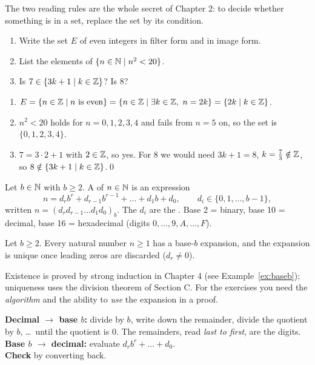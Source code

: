 The two reading rules are the whole secret of Chapter 2: to decide whether something is in a set, replace the set by its condition.

\begin{hexample}
\begin{enumerate}
\item Write the set $E$ of even integers in filter form and in image form.
\item List the elements of $\{n\in\mathbb{N}\mid n^2<20\}$.
\item Is $7\in\{3k+1\mid k\in\mathbb{Z}\}$? Is $8$?
\end{enumerate}
\solution
\begin{enumerate}
\item $E=\{n\in\mathbb{Z}\mid n \text{ is even}\}=\{n\in\mathbb{Z}\mid \exists k\in\mathbb{Z},\ n=2k\}=\{2k\mid k\in\mathbb{Z}\}$.
\item $n^2<20$ holds for $n=0,1,2,3,4$ and fails from $n=5$ on, so the set is $\{0,1,2,3,4\}$.\reason{$0\in\N$!}
\item $7=3\cdot2+1$ with $2\in\mathbb{Z}$, so yes. For $8$ we would need $3k+1=8$, \ie $k=\tfrac73\notin\mathbb{Z}$, so $8\notin\{3k+1\mid k\in\mathbb{Z}\}$.\qed
\end{enumerate}
\end{hexample}


\begin{key}
Let $b\in\mathbb{N}$ with $b\ge2$. A  of $n\in\mathbb{N}$ is an expression
\[
n=d_r b^r+d_{r-1}b^{r-1}+\dots+d_1 b+d_0,\qquad d_i\in\{0,1,\dots,b-1\},
\]
written $n=(d_r d_{r-1}\dots d_1 d_0)_b$. The $d_i$ are the . Base 2 = binary, base 10 = decimal, base 16 = hexadecimal (digits $0,\dots,9,A,\dots,F$).
\end{key}

\begin{result}
Let $b\ge2$. Every natural number $n\ge1$ has a base-$b$ expansion, and the expansion is unique once leading zeros are discarded ($d_r\ne0$).
\end{result}
Existence is proved by strong induction in Chapter 4 (see Example~\ref{ex:baseb}); uniqueness uses the division theorem of Section C. For the exercises you need the \emph{algorithm} and the ability to \emph{use} the expansion in a proof.

\begin{strategy}
\textbf{Decimal $\to$ base $b$:} divide by $b$, write down the remainder, divide the quotient by $b$, \dots\ until the quotient is $0$. The remainders, read \emph{last to first}, are the digits.\\
\textbf{Base $b$ $\to$ decimal:} evaluate $d_r b^r+\dots+d_0$.\\
\textbf{Check} by converting back.
\end{strategy}

